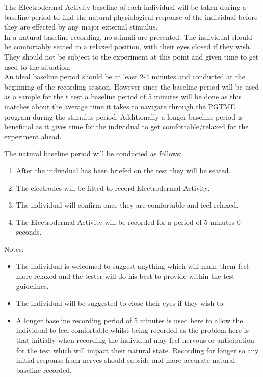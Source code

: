 \documentclass{report}
\begin{document}
The Electrodermal Activity baseline of each individual will be taken during a baseline period to find the natural physiological response of the individual before
they are effected by any major external stimulus.\\
In a natural baseline recording, no stimuli are presented. The individual should be comfortably seated in a relaxed position, with their eyes closed if they wish. 
They should not be subject to the experiment at this point and given time to get used to the situation.\\
An ideal baseline period should be at least 2-4 minutes and conducted at the beginning of the recording session. However since the baseline period will be used as a sample
for the t test a baseline period of 5 minutes will be done as this matches about the average time it takes to navigate through the PGTME program during the stimulus period.
Additionally a longer baseline period is beneficial as it gives time for the individual to get comfortable/relaxed for the experiment ahead.

The natural baseline period will be conducted as follows:

\begin{enumerate}
	\item After the individual has been briefed on the test they will be seated.
	\item The electrodes will be fitted to record Electrodermal Activity.
	\item The individual will confirm once they are comfortable and feel relaxed.
	\item The Electrodermal Activity will be recorded for a period of 5 minutes 0 seconds.
\end{enumerate}
Notes:
\begin{itemize}
	\item The individual is welcomed to suggest anything which will make them feel more relaxed and the tester will do his best to provide within the test guidelines.
	\item The individual will be suggested to close their eyes if they wish to.
	\item A longer baseline recording period of 5 minutes is used here to allow the individual to feel comfortable whilst being recorded as the problem here is that initially  
	when recording the individual may feel nervous or anticipation for the test which will impact their natural state. Recording for longer so any initial response from nerves 
	should subside and more accurate natural baseline recorded.
\end{itemize}
\end{document}
